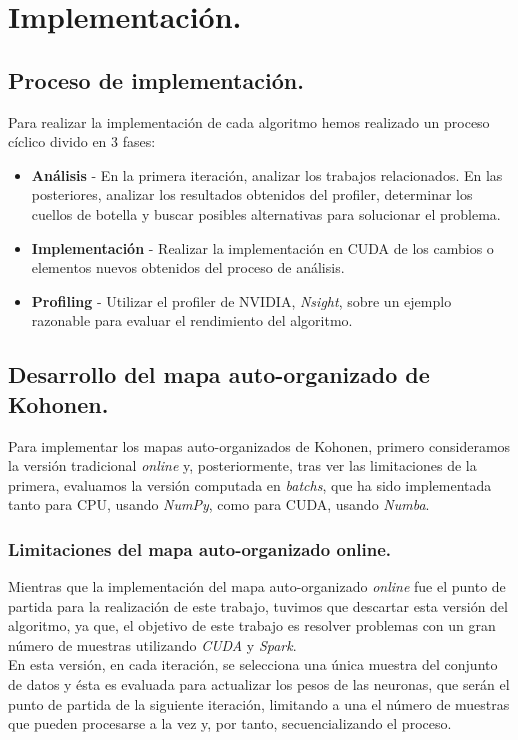 \chapter{Implementación.}
%
\section{Proceso de implementación.}
Para realizar la implementación de cada algoritmo hemos realizado un proceso cíclico divido en 3 fases:

\begin{itemize}
	\item \textbf{Análisis} - En la primera iteración, analizar los trabajos relacionados. En las posteriores, analizar los resultados obtenidos del profiler, determinar los cuellos de botella y buscar posibles alternativas para solucionar el problema.
	\item \textbf{Implementación} - Realizar la implementación en CUDA de los cambios o elementos nuevos obtenidos del proceso de análisis.
	\item \textbf{Profiling} - Utilizar el profiler de NVIDIA, \textit{Nsight}, sobre un ejemplo razonable para evaluar el rendimiento del algoritmo.
\end{itemize}

\section{Desarrollo del mapa auto-organizado de Kohonen.}
Para implementar los mapas auto-organizados de Kohonen, primero consideramos la versión tradicional \textit{online} y, posteriormente, tras ver las limitaciones de la primera, evaluamos la versión computada en \textit{batchs}, que ha sido implementada tanto para CPU, usando \textit{NumPy}, como para CUDA, usando \textit{Numba}.

\subsection{Limitaciones del mapa auto-organizado online.}
Mientras que la implementación del mapa auto-organizado \textit{online} fue el punto de partida para la realización de este trabajo, tuvimos que descartar esta versión del algoritmo, ya que, el objetivo de este trabajo es resolver problemas con un gran número de muestras utilizando \textit{CUDA} y \textit{Spark}.\\

En esta versión, en cada iteración, se selecciona una única muestra del conjunto de datos y ésta es evaluada para actualizar los pesos de las neuronas, que serán el punto de partida de la siguiente iteración, limitando a una el número de muestras que pueden procesarse a la vez y, por tanto, secuencializando el proceso.\\

